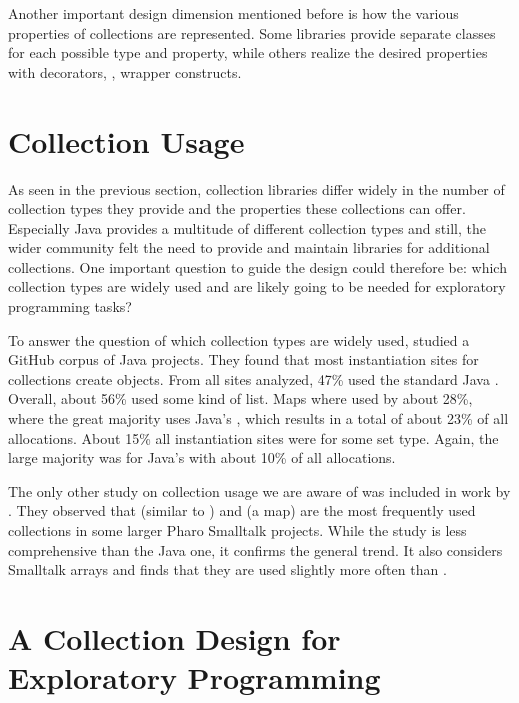 \documentclass[sigconf, 10pt]{acmart}
\begin{document}
Another important design dimension mentioned before is
how the various properties of collections are represented.
Some libraries provide separate classes for each possible type and property,
while others realize the desired properties with decorators,
\ie, wrapper constructs.

\section{Collection Usage}
\label{sec:usage}

As seen in the previous section,
collection libraries differ widely
in the number of collection types they provide
and the properties these collections can offer.
Especially Java provides a multitude of different collection types and still,
the wider community felt the need to provide and maintain libraries
for additional collections.
One important question to guide the design could therefore be:
which collection types are widely used and are likely going to be needed
for exploratory programming tasks?

To answer the question of which collection types are widely used,
\citet{Costa:2017:ESU} studied a GitHub corpus of Java projects\citep{6624029}.
They found that most instantiation sites for collections
create  objects.
From all sites analyzed, 47\% used the standard Java .
Overall, about 56\% used some kind of list.
Maps where used by about 28\%,
where the great majority uses Java's ,
which results in a total of about 23\% of all allocations.
About 15\% all instantiation sites were for some set type.
Again, the large majority was for Java's 
with about 10\% of all allocations.

The only other study on collection usage we are aware of
was included in work by \citet[sec. 9.2]{Bergel:2018}.
They observed that  (similar to )
and  (a map) are the most frequently used collections
in some larger Pharo Smalltalk projects.
While the study is less comprehensive than the Java one,
it confirms the general trend.
It also considers Smalltalk arrays
and finds that they are used slightly more often than .

\section{A Collection Design for Exploratory Programming}
\end{document}
